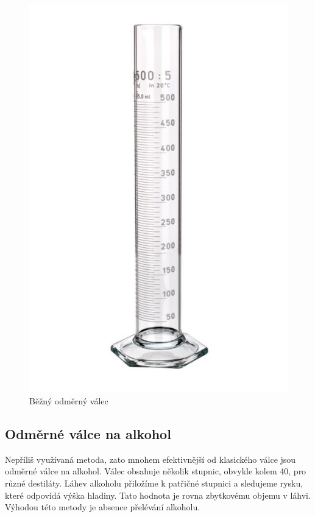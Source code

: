 \begin{figure}[!h]
    \begin{center}
        \includegraphics[scale=0.4]{obrazky/odměrný válec.jpg}
    \end{center}
    \caption{Běžný odměrný válec \cite{Odměrný válec}}
\end{figure}


\subsection{Odměrné válce na alkohol}
\label{valec_na_alkohol}

Nepříliš využívaná metoda, zato mnohem efektivnější od klasického válce jsou odměrné válce na alkohol. Válec obsahuje několik stupnic, obvykle kolem 40, pro různé destiláty. Láhev alkoholu přiložíme k patřičné stupnici a sledujeme rysku, které odpovídá výška hladiny. Tato hodnota je rovna zbytkovému objemu v láhvi. Výhodou této metody je absence přelévání alkoholu.\\

